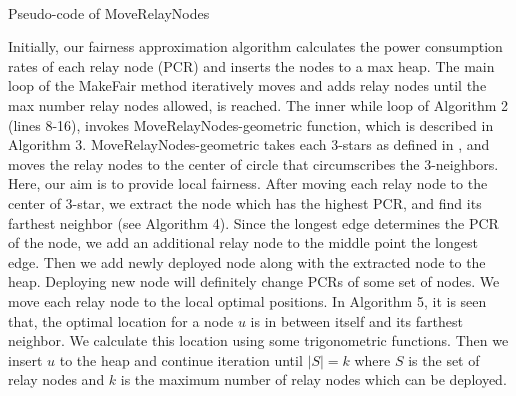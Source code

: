 \begin{algorithm}[htp]

\dontprintsemicolon
{}
\\
\caption{Pseudo-code of MoveRelayNodes}
\label{MoveRelayNodes}
\end{algorithm}


Initially, our fairness approximation algorithm calculates the power consumption rates of each relay node (PCR) and inserts the nodes to a max heap. The main loop of the MakeFair method iteratively moves and adds relay nodes until the max number relay nodes allowed, is reached. The inner while loop of Algorithm 2 (lines 8-16), invokes MoveRelayNodes-geometric function, which is described in Algorithm 3. MoveRelayNodes-geometric takes each 3-stars as defined in \cite{RelaySensor}, and moves the relay nodes to the center of circle that circumscribes the 3-neighbors. Here, our aim is to provide local fairness. After moving each relay node to the center of 3-star, we extract the node which has the highest PCR, and find its farthest neighbor (see Algorithm 4). Since the longest edge determines the PCR of the node, we add an additional relay node to the middle point the longest edge. Then we add newly deployed node along with the extracted node to the heap. Deploying new node will definitely change PCRs of some set of nodes. We move each relay node to the local optimal positions. In Algorithm 5, it is seen that, the optimal location for a node $u$ is in between itself and its farthest neighbor. We calculate this location using some trigonometric functions. Then we insert $u$ to the heap and continue iteration until $\left|S\right|=k$ where $S$ is the set of relay nodes and $k$ is the maximum number of relay nodes which can be deployed.


